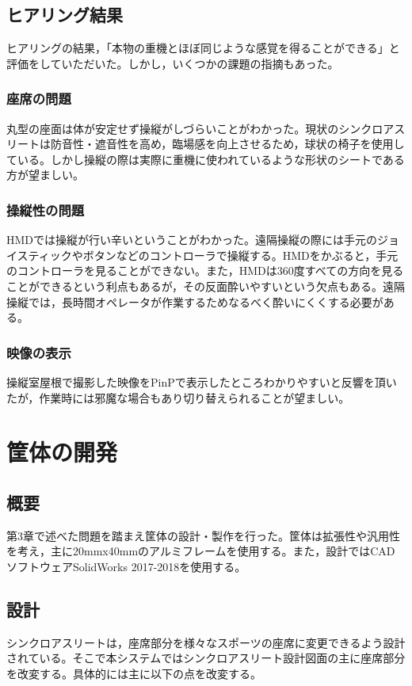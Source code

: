 \documentclass[a4paper,12pt]{jsarticle}
\begin{document}
\clearpage
\subsection{ヒアリング結果}
ヒアリングの結果，「本物の重機とほぼ同じような感覚を得ることができる」と評価をしていただいた。しかし，いくつかの課題の指摘もあった。

\subsubsection{座席の問題}
丸型の座面は体が安定せず操縦がしづらいことがわかった。現状のシンクロアスリートは防音性・遮音性を高め，臨場感を向上させるため，球状の椅子を使用している。しかし操縦の際は実際に重機に使われているような形状のシートである方が望ましい。

\subsubsection{操縦性の問題}
HMDでは操縦が行い辛いということがわかった。遠隔操縦の際には手元のジョイスティックやボタンなどのコントローラで操縦する。HMDをかぶると，手元のコントローラを見ることができない。また，HMDは360度すべての方向を見ることができるという利点もあるが，その反面酔いやすいという欠点もある。遠隔操縦では，長時間オペレータが作業するためなるべく酔いにくくする必要がある。

\subsubsection{映像の表示}
操縦室屋根で撮影した映像をPinPで表示したところわかりやすいと反響を頂いたが，作業時には邪魔な場合もあり切り替えられることが望ましい。


\clearpage

\section{筐体の開発}
\subsection{概要}
第3章で述べた問題を踏まえ筐体の設計・製作を行った。筐体は拡張性や汎用性を考え，主に20mmx40mmのアルミフレームを使用する。また，設計ではCADソフトウェアSolidWorks 2017-2018を使用する。

\subsection{設計}
シンクロアスリートは，座席部分を様々なスポーツの座席に変更できるよう設計されている。そこで本システムではシンクロアスリート設計図面の主に座席部分を改変する。具体的には主に以下の点を改変する。
\end{document}
